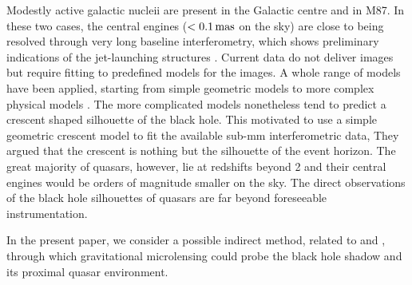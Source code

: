 \documentclass[usenatbib]{mn2e}
\begin{document}
Modestly active galactic nucleii are present in the Galactic centre
and in M87.  In these two cases, the central engines ($<0.1\rm\,mas$
on the sky) are close to being resolved through very long baseline
interferometry, which shows preliminary indications of the
jet-launching structures
\citep{2008JPhCS.131a2055D,2012Sci...338..355D,2016ApJ...820...90F}.
Current data do not deliver images but require fitting to predefined
models for the images.  A whole range of models have been applied,
starting from simple geometric models to more complex physical models
\citep{2008Natur.455...78D,2011ApJ...738...38B,2009ApJ...706..497M,2010ApJ...717.1092D}.
The more complicated models nonetheless tend to predict a crescent
shaped silhouette of the black hole.  This motivated
\cite{2013MNRAS.434..765K} to use a simple geometric crescent model to
fit the available sub-mm interferometric data, They argued that the
crescent is nothing but the silhouette of the event horizon.
The great majority of quasars, however, lie at redshifts beyond 2
\citep{2014A&A...563A..54P} and their central engines would be orders
of magnitude smaller on the sky. The direct observations of the black
hole silhouettes of quasars are far beyond foreseeable
instrumentation.

In the present paper, we consider a possible indirect method, related
to \cite{1999ApJ...524...49A} and \cite{2015ApJ...814L..26M}, 
through which gravitational
microlensing could probe the black hole shadow and its proximal quasar
environment.
\end{document}
